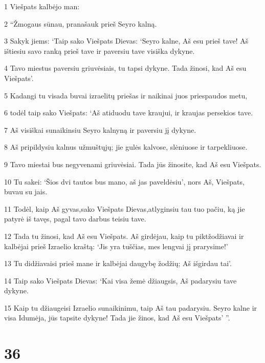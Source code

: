 \par 1 Viešpats kalbėjo man: 
\par 2 “Žmogaus sūnau, pranašauk prieš Seyro kalną. 
\par 3 Sakyk jiems: ‘Taip sako Viešpats Dievas: ‘Seyro kalne, Aš esu prieš tave! Aš ištiesiu savo ranką prieš tave ir paversiu tave visiška dykyne. 
\par 4 Tavo miestus paversiu griuvėsiais, tu tapsi dykyne. Tada žinosi, kad Aš esu Viešpats’. 
\par 5 Kadangi tu visada buvai izraelitų priešas ir naikinai juos priespaudos metu, 
\par 6 todėl taip sako Viešpats: ‘Aš atiduodu tave kraujui, ir kraujas persekios tave. 
\par 7 Aš visiškai sunaikinsiu Seyro kalnyną ir paversiu jį dykyne. 
\par 8 Aš pripildysiu kalnus užmuštųjų; jie gulės kalvose, slėniuose ir tarpekliuose. 
\par 9 Tavo miestai bus negyvenami griuvėsiai. Tada jūs žinosite, kad Aš esu Viešpats. 
\par 10 Tu sakei: ‘Šios dvi tautos bus mano, aš jas paveldėsiu’, nors Aš, Viešpats, buvau su jais. 
\par 11 Todėl, kaip Aš gyvas,­sako Viešpats Dievas,­atlyginsiu tau tuo pačiu, ką jie patyrė iš tavęs, pagal tavo darbus teisiu tave. 
\par 12 Tada tu žinosi, kad Aš esu Viešpats. Aš girdėjau, kaip tu piktžodžiavai ir kalbėjai prieš Izraelio kraštą: ‘Jis yra tuščias, mes lengvai jį prarysime!’ 
\par 13 Tu didžiavaisi prieš mane ir kalbėjai daugybę žodžių; Aš išgirdau tai’. 
\par 14 Taip sako Viešpats Dievas: ‘Kai visa žemė džiaugsis, Aš padarysiu tave dykyne. 
\par 15 Kaip tu džiaugeisi Izraelio sunaikinimu, taip Aš tau padarysiu. Seyro kalne ir visa Idumėja, jūs tapsite dykyne! Tada jie žinos, kad Aš esu Viešpats’ ”.



\chapter{36}


